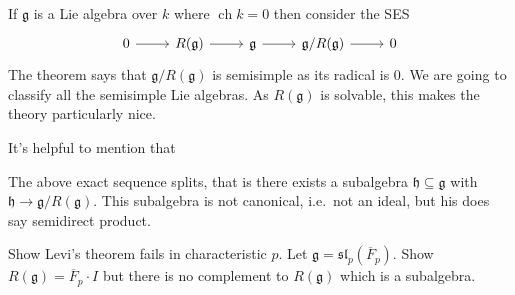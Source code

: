 \documentclass[a4paper]{article}
\newcommand*{\Lie}[1]{\mathfrak{#1}} %
\DeclareMathOperator{\cha}{ch} %
\begin{document}
\begin{remark}
  If \(\Lie g\) is a Lie algebra over \(k\) where \(\cha k = 0\) then consider the SES
  \[
    \begin{tikzcd}
      0 \ar[r] & R(\Lie g) \ar[r] & \Lie g \ar[r] & \Lie g/R(\Lie g) \ar[r] & 0
    \end{tikzcd}
  \]
  The theorem says that \(\Lie g/R(\Lie g)\) is semisimple as its radical is \(0\). We are going to classify all the semisimple Lie algebras. As \(R(\Lie g)\) is solvable, this makes the theory particularly nice.
\end{remark}

It's helpful to mention that

\begin{theorem}[Levi]
  The above exact sequence splits, that is there exists a subalgebra \(\Lie h \subseteq \Lie g\) with \(\Lie h \to \Lie g/R(\Lie g)\). This subalgebra is not canonical, i.e.\ not an ideal, but his does say semidirect product.
\end{theorem}

\begin{ex}
  Show Levi's theorem fails in characteristic \(p\). Let \(\Lie g = \Lie{sl}_p(\overline F_p)\). Show \(R(\Lie g) = \overline F_p \cdot I\) but there is no complement to \(R(\Lie g)\) which is a subalgebra.
\end{ex}
\end{document}
